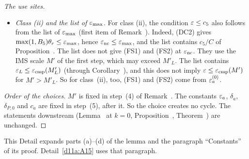 \begin{proof}[The use sites]
\begin{itemize}
\item \emph{Class (ii) and the list of $\varepsilon_{\max}$.} For class (ii), the condition $\varepsilon\le c_5$ also follows from the list of $\varepsilon_{\max}$ (first item of Remark~). Indeed, (DC2) gives $\max(1,B_5)\theta_r\le\varepsilon_{\max}$, hence $\varepsilon_{\rm nc}\le\varepsilon_{\max}$, and the list contains $c_5/C$ of Proposition~. The list does not give (FS1) and (FS2) at $\varepsilon_{\rm nc}$. They use the IMS scale $M'$ of the first step, which may exceed $M'_L$. The list contains $\varepsilon_L\le\varepsilon_{\rm cmp}(M'_L)$ (through Corollary~), and this does not imply $\varepsilon\le\varepsilon_{\rm cmp}(M')$ for $M'>M'_L$. So for class~(ii), too, (FS1) and (FS2) come from $\varepsilon_a^{(0)}$.
\end{itemize}
\emph{Order of the choices.} $M'$ is fixed in step~(4) of Remark~. The constants $\varepsilon_a$, $\delta_a$, $\delta_{P,0}$ and $c_a$ are fixed in step~(5), after it. So the choice creates no cycle. The statements downstream (Lemma~ at $k=0$, Proposition~, Theorem~) are unchanged.
\end{proof}

\begin{detail}\label{xb:d-k0-formula}
This Detail expands parts (a)--(d) of the lemma and the paragraph ``Constants'' of its proof. Detail~\ref{d11a:A15} uses that paragraph.
\end{detail}

